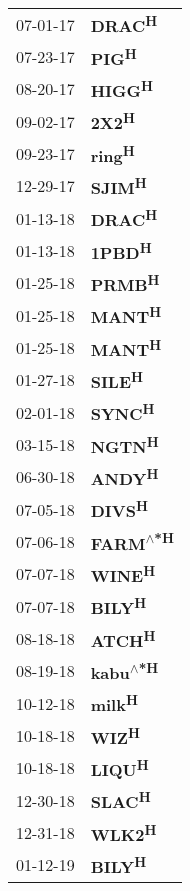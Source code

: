 \begin{supertabular}{p{0.08\textwidth}p{0.2\textwidth}}
 07-01-17 &           \textbf{DRAC\textsuperscript{H}} \\
 07-23-17 &            \textbf{PIG\textsuperscript{H}} \\
 08-20-17 &           \textbf{HIGG\textsuperscript{H}} \\
 09-02-17 &            \textbf{2X2\textsuperscript{H}} \\
 09-23-17 &           \textbf{ring\textsuperscript{H}} \\
 12-29-17 &           \textbf{SJIM\textsuperscript{H}} \\
 01-13-18 &           \textbf{DRAC\textsuperscript{H}} \\
 01-13-18 &           \textbf{1PBD\textsuperscript{H}} \\
 01-25-18 &           \textbf{PRMB\textsuperscript{H}} \\
 01-25-18 &           \textbf{MANT\textsuperscript{H}} \\
 01-25-18 &           \textbf{MANT\textsuperscript{H}} \\
 01-27-18 &           \textbf{SILE\textsuperscript{H}} \\
 02-01-18 &           \textbf{SYNC\textsuperscript{H}} \\
 03-15-18 &           \textbf{NGTN\textsuperscript{H}} \\
 06-30-18 &           \textbf{ANDY\textsuperscript{H}} \\
 07-05-18 &           \textbf{DIVS\textsuperscript{H}} \\
 07-06-18 &  \textbf{FARM\textsuperscript{$\wedge$*H}} \\
 07-07-18 &           \textbf{WINE\textsuperscript{H}} \\
 07-07-18 &           \textbf{BILY\textsuperscript{H}} \\
 08-18-18 &           \textbf{ATCH\textsuperscript{H}} \\
 08-19-18 &  \textbf{kabu\textsuperscript{$\wedge$*H}} \\
 10-12-18 &           \textbf{milk\textsuperscript{H}} \\
 10-18-18 &            \textbf{WIZ\textsuperscript{H}} \\
 10-18-18 &           \textbf{LIQU\textsuperscript{H}} \\
 12-30-18 &           \textbf{SLAC\textsuperscript{H}} \\
 12-31-18 &           \textbf{WLK2\textsuperscript{H}} \\
 01-12-19 &           \textbf{BILY\textsuperscript{H}} \\

\end{supertabular}
